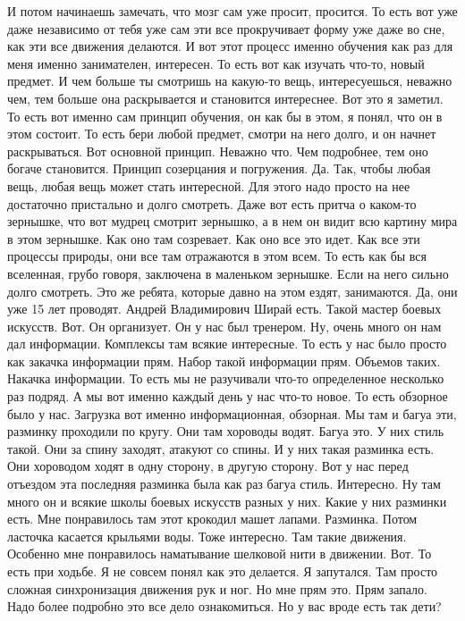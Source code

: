 И потом начинаешь замечать, что мозг сам уже просит, просится.
То есть вот уже даже независимо от тебя уже сам эти все прокручивает форму уже даже во сне,
как эти все движения делаются.
И вот этот процесс именно обучения как раз для меня именно занимателен, интересен.
То есть вот как изучать что-то, новый предмет.
И чем больше ты смотришь на какую-то вещь, интересуешься, неважно чем,
тем больше она раскрывается и становится интереснее.
Вот это я заметил.
То есть вот именно сам принцип обучения, он как бы в этом, я понял, что он в этом состоит.
То есть бери любой предмет, смотри на него долго, и он начнет раскрываться.
Вот основной принцип.
Неважно что.
Чем подробнее, тем оно богаче становится.
Принцип созерцания и погружения.
Да.
Так, чтобы любая вещь, любая вещь может стать интересной.
Для этого надо просто на нее достаточно пристально и долго смотреть.
Даже вот есть притча о каком-то зернышке, что вот мудрец смотрит зернышко,
а в нем он видит всю картину мира в этом зернышке.
Как оно там созревает.
Как оно все это идет.
Как все эти процессы природы, они все там отражаются в этом всем.
То есть как бы вся вселенная, грубо говоря, заключена в маленьком зернышке.
Если на него сильно долго смотреть.
Это же ребята, которые давно на этом ездят, занимаются.
Да, они уже 15 лет проводят.
Андрей Владимирович Ширай есть.
Такой мастер боевых искусств.
Вот.
Он организует.
Он у нас был тренером.
Ну, очень много он нам дал информации.
Комплексы там всякие интересные.
То есть у нас было просто как закачка информации прям.
Набор такой информации прям.
Объемов таких.
Накачка информации.
То есть мы не разучивали что-то определенное несколько раз подряд.
А мы вот именно каждый день у нас что-то новое.
То есть обзорное было у нас.
Загрузка вот именно информационная, обзорная.
Мы там и багуа эти, разминку проходили по кругу.
Они там хороводы водят.
Багуа это.
У них стиль такой.
Они за спину заходят, атакуют со спины.
И у них такая разминка есть.
Они хороводом ходят в одну сторону, в другую сторону.
Вот у нас перед отъездом эта последняя разминка была как раз багуа стиль.
Интересно.
Ну там много он и всякие школы боевых искусств разных у них.
Какие у них разминки есть.
Мне понравилось там этот крокодил машет лапами.
Разминка.
Потом ласточка касается крыльями воды.
Тоже интересно.
Там такие движения.
Особенно мне понравилось наматывание шелковой нити в движении.
Вот.
То есть при ходьбе.
Я не совсем понял как это делается.
Я запутался.
Там просто сложная синхронизация движения рук и ног.
Но мне прям это.
Прям запало.
Надо более подробно это все дело ознакомиться.
Но у вас вроде есть так дети?
